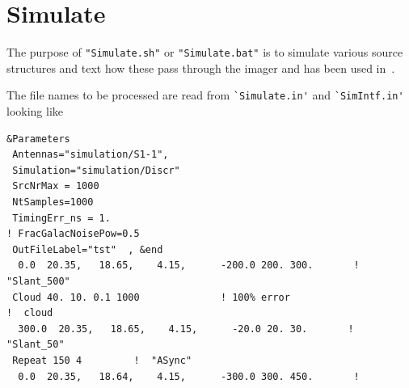 
\section{Simulate}

The purpose of \verb!"Simulate.sh"! or  \verb!"Simulate.bat"! is to simulate various source structures and text how these pass through the imager and has been used in~\cite{Scholten:2022}.

The file names to be processed are read from  \verb#`Simulate.in'# and \verb#`SimIntf.in'#  looking like

\begin{linenumbers}
\resetlinenumber
\begin{verbatim}
&Parameters
 Antennas="simulation/S1-1",
 Simulation="simulation/Discr"
 SrcNrMax = 1000
 NtSamples=1000
 TimingErr_ns = 1.
! FracGalacNoisePow=0.5
 OutFileLabel="tst"  , &end
  0.0  20.35,   18.65,    4.15,      -200.0 200. 300.       !  "Slant_500"
 Cloud 40. 10. 0.1 1000              ! 100% error                         !  cloud
  300.0  20.35,   18.65,    4.15,      -20.0 20. 30.       !  "Slant_50"
 Repeat 150 4         !  "ASync"
  0.0  20.35,   18.64,    4.15,      -300.0 300. 450.       !
\end{verbatim}
\end{linenumbers}

